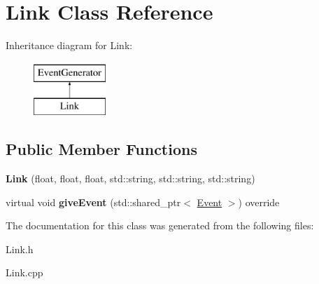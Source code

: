 \hypertarget{classLink}{\section{\-Link \-Class \-Reference}
\label{classLink}
}
\-Inheritance diagram for \-Link\-:\begin{figure}[H]
\begin{center}
\leavevmode
\includegraphics[height=2.000000cm]{classLink}
\end{center}
\end{figure}
\subsection*{\-Public \-Member \-Functions}
\begin{DoxyCompactItemize}
\item 
\hypertarget{classLink_af193bb2a442252ada227fcb2c16c627d}{{\bfseries \-Link} (float, float, float, std\-::string, std\-::string, std\-::string)}\label{classLink_af193bb2a442252ada227fcb2c16c627d}

\item 
\hypertarget{classLink_abd9466c4c2097329f4affd9b2eafbd7a}{virtual void {\bfseries give\-Event} (std\-::shared\-\_\-ptr$<$ \hyperlink{classEvent}{\-Event} $>$) override}\label{classLink_abd9466c4c2097329f4affd9b2eafbd7a}

\end{DoxyCompactItemize}


\-The documentation for this class was generated from the following files\-:\begin{DoxyCompactItemize}
\item 
\-Link.\-h\item 
\-Link.\-cpp\end{DoxyCompactItemize}
